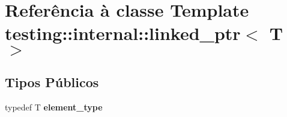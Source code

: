 \hypertarget{classtesting_1_1internal_1_1linked__ptr}{\section{Referência à classe Template testing\-:\-:internal\-:\-:linked\-\_\-ptr$<$ T $>$}
\label{classtesting_1_1internal_1_1linked__ptr}
}
\subsection*{Tipos Públicos}
\begin{DoxyCompactItemize}
\item 
\hypertarget{classtesting_1_1internal_1_1linked__ptr_a295c7d1ee4100d916514c4e4385a0063}{typedef T {\bfseries element\-\_\-type}}\label{classtesting_1_1internal_1_1linked__ptr_a295c7d1ee4100d916514c4e4385a0063}

\end{DoxyCompactItemize}
